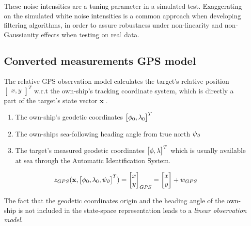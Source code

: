 These noise intensities are a tuning parameter in a simulated test. Exaggerating on the simulated white noise intensities is a common approach when developing filtering algorithms, in order to assure robustness under non-linearity and non-Gaussianity effects when testing on real data.

\subsection{Converted measurements GPS model}


The relative GPS observation model calculates the target's relative position $\begin{bmatrix}x, y\end{bmatrix}^{T} $ w.r.t the own-ship's tracking coordinate system, which is directly a part of the target's state vector $\mathbf{x}$
. 

\begin{enumerate}
\item The own-ship's geodetic coordinates $\begin{bmatrix}{\phi}_{0}, {\lambda}_{0} \end{bmatrix}^{T}$
\item The own-ships sea-following heading angle from true north ${\psi}_{\textit{0}}$
\item The target's measured geodetic coordinates $\begin{bmatrix}{\phi}, {\lambda}\end{bmatrix}^{T}$ which is usually available at sea through the Automatic Identification System.
\end{enumerate}




\begin{equation}
z_{GPS}(\mathbf{x},\begin{bmatrix}{\phi}_{0}, {\lambda}_{0}, {\psi}_{\textit{0}} \end{bmatrix}^{T}) = \begin{bmatrix}
x \\
y
\end{bmatrix}_{GPS} = \begin{bmatrix}
x \\
y
\end{bmatrix} + {w}_{GPS}
\end{equation}

The fact that the geodetic coordinates origin and the heading angle of the own-ship is not included in the state-space representation leads to a \emph{linear observation model}.

